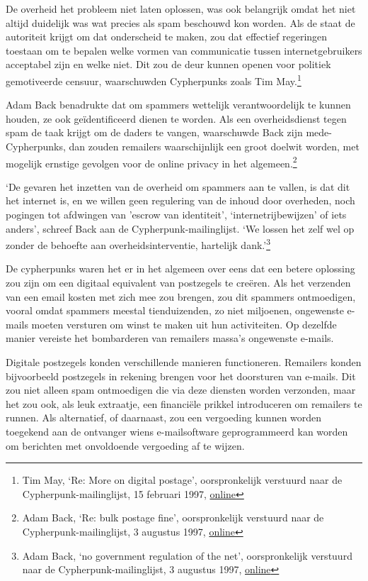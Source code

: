 \documentclass[smalldemyvopaper,11pt,twoside,onecolumn,openright,extrafontsizes,hidelinks]{memoir}
\begin{document}
De overheid het probleem niet laten oplossen, was ook belangrijk omdat
het niet altijd duidelijk was wat precies als spam beschouwd kon worden.
Als de staat de autoriteit krijgt om dat onderscheid te maken, zou dat
effectief regeringen toestaan om te bepalen welke vormen van
communicatie tussen internetgebruikers acceptabel zijn en welke niet.
Dit zou de deur kunnen openen voor politiek gemotiveerde censuur,
waarschuwden Cypherpunks zoals Tim May.\footnote{Tim May, `Re: More on
  digital postage', oorspronkelijk verstuurd naar de
  Cypherpunk-mailinglijst, 15 februari 1997,
  \href{https://cypherpunks.venona.com/date/1997/02/msg02295.h}{online}}

Adam Back benadrukte dat om spammers wettelijk verantwoordelijk te
kunnen houden, ze ook geïdentificeerd dienen te worden. Als een
overheidsdienst tegen spam de taak krijgt om de daders te vangen,
waarschuwde Back zijn mede-Cypherpunks, dan zouden remailers
waarschijnlijk een groot doelwit worden, met mogelijk ernstige gevolgen
voor de online privacy in het algemeen.\footnote{Adam Back, `Re: bulk
  postage fine', oorspronkelijk verstuurd naar de
  Cypherpunk-mailinglijst, 3 augustus 1997,
  \href{https://cypherpunks.venona.com/date/1997/08/msg00070.html}{online}}

`De gevaren het inzetten van de overheid om spammers aan te vallen, is
dat dit het internet is, en we willen geen regulering van de inhoud door
overheden, noch pogingen tot afdwingen van 'escrow van identiteit',
`internetrijbewijzen' of iets anders', schreef Back aan de
Cypherpunk-mailinglijst. `We lossen het zelf wel op zonder de behoefte
aan overheidsinterventie, hartelijk dank.'\footnote{Adam Back, `no
  government regulation of the net', oorspronkelijk verstuurd naar de
  Cypherpunk-mailinglijst, 3 augustus 1997,
  \href{https://cypherpunks.venona.com/date/1997/08/msg00087.html}{online}}

De cypherpunks waren het er in het algemeen over eens dat een betere
oplossing zou zijn om een digitaal equivalent van postzegels te creëren.
Als het verzenden van een email kosten met zich mee zou brengen, zou dit
spammers ontmoedigen, vooral omdat spammers meestal tienduizenden, zo
niet miljoenen, ongewenste e-mails moeten versturen om winst te maken
uit hun activiteiten. Op dezelfde manier vereiste het bombarderen van
remailers massa's ongewenste e-mails.

Digitale postzegels konden verschillende manieren functioneren.
Remailers konden bijvoorbeeld postzegels in rekening brengen voor het
doorsturen van e-mails. Dit zou niet alleen spam ontmoedigen die via
deze diensten worden verzonden, maar het zou ook, als leuk extraatje,
een financiële prikkel introduceren om remailers te runnen. Als
alternatief, of daarnaast, zou een vergoeding kunnen worden toegekend
aan de ontvanger wiens e-mailsoftware geprogrammeerd kan worden om
berichten met onvoldoende vergoeding af te wijzen.
\end{document}

